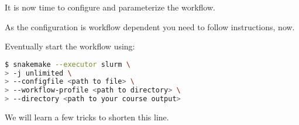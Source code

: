 \begin{frame}[fragile]
  \frametitle{}
  It is now time to configure and parameterize the workflow.
  \pause
  \begin{hint}
  	As the configuration is workflow dependent you need to follow instructions, now.
  \end{hint}
  \pause
  Eventually start the workflow using:
  \begin{lstlisting}[language=Bash, style=Shell]
$ snakemake --executor slurm \
> -j unlimited \
> --configfile <path to file> \
> --workflow-profile <path to directory> \
> --directory <path to your course output>
  \end{lstlisting}
  \pause
  \begin{hint}
  	We will learn a few tricks to shorten this line.
  \end{hint}
\end{frame}


